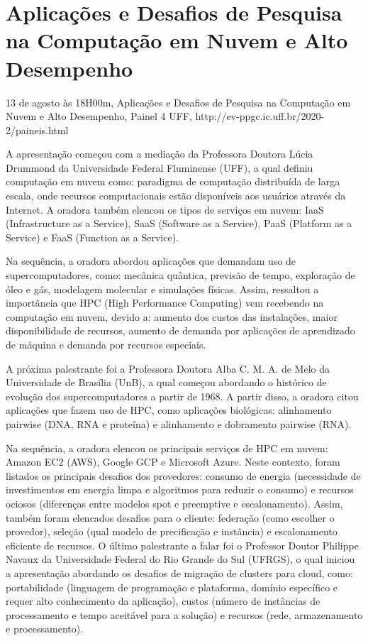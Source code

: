 \section{Aplicações e Desafios de Pesquisa na Computação em Nuvem e Alto Desempenho}

\begin{center}
  \vspace{1cm}
  13 de agosto às 18H00m, Aplicações e Desafios de Pesquisa na Computação em Nuvem e Alto Desempenho, Painel 4 UFF, http://ev-ppgc.ic.uff.br/2020-2/paineis.html
  \vspace{1cm}
\end{center}

A apresentação começou com a mediação da Professora Doutora Lúcia Drummond da Universidade Federal Fluminense (UFF), a qual definiu computação em nuvem como: paradigma de computação distribuída de larga escala, onde recursos computacionais estão disponíveis aos usuários através da Internet. A oradora também elencou os tipos de serviços em nuvem: IaaS (Infrastructure as a Service), SaaS (Software as a Service), PaaS (Platform as a Service) e FaaS (Function as a Service).

Na sequência, a oradora abordou aplicações que demandam uso de supercomputadores, como: mecânica quântica, previsão de tempo, exploração de óleo e gás, modelagem molecular e simulações físicas. Assim, ressaltou a importância que HPC (High Performance Computing) vem recebendo na computação em nuvem, devido a: aumento dos custos das instalações, maior disponibilidade de recursos, aumento de demanda por aplicações de aprendizado de máquina e demanda por recursos especiais.

A próxima palestrante foi  a Professora Doutora Alba C. M. A. de Melo da Universidade de Brasília (UnB), a qual começou abordando o histórico de evolução dos supercomputadores a partir de 1968. A partir disso, a oradora citou aplicações que fazem uso de HPC, como aplicações biológicas: alinhamento pairwise (DNA, RNA e proteína) e alinhamento e dobramento pairwise (RNA).

Na sequência, a oradora elencou os principais serviços de HPC em nuvem: Amazon EC2 (AWS), Google GCP e Microsoft Azure. Neste contexto, foram listados os principais desafios dos provedores: consumo de energia (necessidade de investimentos em energia limpa e algoritmos para reduzir o consumo) e recursos ociosos (diferenças entre modelos spot e preemptive e escalonamento). Assim, também foram elencados desafios para o cliente: federação (como escolher o provedor), seleção (qual modelo de precificação e instância) e escalonamento eficiente de recursos.
O último palestrante a falar foi o Professor Doutor Philippe Navaux da Universidade Federal do Rio Grande do Sul (UFRGS), o qual iniciou a apresentação abordando os desafios de migração de clusters para cloud, como: portabilidade (linguagem de programação e plataforma, domínio específico e requer alto conhecimento da aplicação), custos (número de instâncias de processamento e tempo aceitável para a solução) e recursos (rede, armazenamento e processamento).

